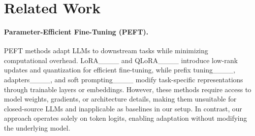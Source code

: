 \section{Related Work}
\label{sec:relatedwork}
\paragraph{Parameter-Efficient Fine-Tuning (PEFT).}  
PEFT methods adapt LLMs to downstream tasks while minimizing computational overhead. LoRA____ and QLoRA____ introduce low-rank updates and quantization for efficient fine-tuning, while prefix tuning____, adapters____, and soft prompting____ modify task-specific representations through trainable layers or embeddings. However, these methods require access to model weights, gradients, or architecture details, making them unsuitable for closed-source LLMs and inapplicable as baselines in our setup. In contrast, our approach operates solely on token logits, enabling adaptation without modifying the underlying model.

 


